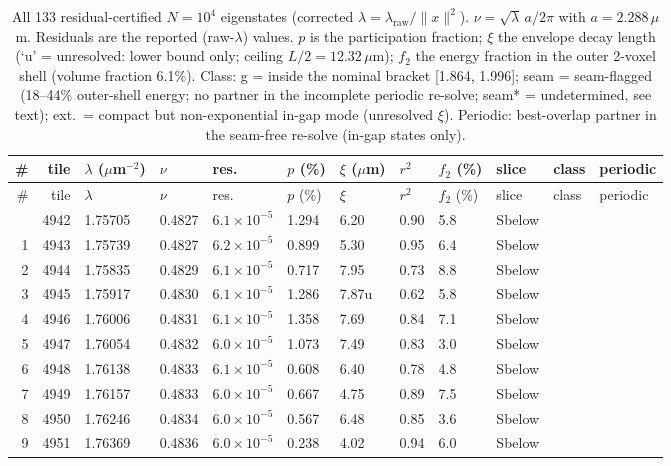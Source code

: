 \begin{longtable}{@{}rrllllllllll@{}}
\caption{All 133 residual-certified $N=10^4$ eigenstates (corrected $\lambda=\lambda_\mathrm{raw}/\|x\|^2$). $\nu=\sqrt{\lambda}\,a/2\pi$ with $a=2.288\,\mu$m. Residuals are the reported (raw-$\lambda$) values. $p$ is the participation fraction; $\xi$ the envelope decay length (`u' = unresolved: lower bound only; ceiling $L/2=12.32\,\mu$m); $f_2$ the energy fraction in the outer 2-voxel shell (volume fraction 6.1\%). Class: g = inside the nominal bracket [1.864, 1.996]; seam = seam-flagged (18--44\% outer-shell energy; no partner in the incomplete periodic re-solve; seam* = undetermined, see text); ext.\ = compact but non-exponential in-gap mode (unresolved $\xi$). Periodic: best-overlap partner in the seam-free re-solve (in-gap states only).}\label{tab:states}\\
\hline\hline
 \# & tile & $\lambda$ ($\mu$m$^{-2}$) & $\nu$ & res. & $p$ (\%) & $\xi$ ($\mu$m) & $r^2$ & $f_2$ (\%) & slice & class & periodic \\
\hline
\endfirsthead
\hline
 \# & tile & $\lambda$ & $\nu$ & res. & $p$ (\%) & $\xi$ & $r^2$ & $f_2$ (\%) & slice & class & periodic \\
\hline
\endhead
\hline
\endfoot
\hline\hline
\endlastfoot
 0 & 4942 & 1.75705 & 0.4827 & $6.1\times10^{-5}$ & 1.294 & 6.20 & 0.90 & 5.8 & Sbelow &  &  \\
 1 & 4943 & 1.75739 & 0.4827 & $6.2\times10^{-5}$ & 0.899 & 5.30 & 0.95 & 6.4 & Sbelow &  &  \\
 2 & 4944 & 1.75835 & 0.4829 & $6.1\times10^{-5}$ & 0.717 & 7.95 & 0.73 & 8.8 & Sbelow &  &  \\
 3 & 4945 & 1.75917 & 0.4830 & $6.1\times10^{-5}$ & 1.286 & 7.87u & 0.62 & 5.8 & Sbelow &  &  \\
 4 & 4946 & 1.76006 & 0.4831 & $6.1\times10^{-5}$ & 1.358 & 7.69 & 0.84 & 7.1 & Sbelow &  &  \\
 5 & 4947 & 1.76054 & 0.4832 & $6.0\times10^{-5}$ & 1.073 & 7.49 & 0.83 & 3.0 & Sbelow &  &  \\
 6 & 4948 & 1.76138 & 0.4833 & $6.1\times10^{-5}$ & 0.608 & 6.40 & 0.78 & 4.8 & Sbelow &  &  \\
 7 & 4949 & 1.76157 & 0.4833 & $6.0\times10^{-5}$ & 0.667 & 4.75 & 0.89 & 7.5 & Sbelow &  &  \\
 8 & 4950 & 1.76246 & 0.4834 & $6.0\times10^{-5}$ & 0.567 & 6.48 & 0.85 & 3.6 & Sbelow &  &  \\
 9 & 4951 & 1.76369 & 0.4836 & $6.0\times10^{-5}$ & 0.238 & 4.02 & 0.94 & 6.0 & Sbelow &  &  \\

\end{longtable}
